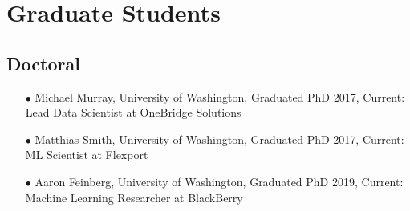 \documentclass{article}[10pt]
\begin{document}
\section*{Graduate Students} %
\subsection*{Doctoral}
\begin{itemize}
\item [$\bullet$] Michael Murray, University of Washington, Graduated PhD 2017, Current: Lead Data Scientist at OneBridge Solutions
\item [$\bullet$] Matthias Smith, University of Washington, Graduated PhD 2017, Current: ML Scientist at Flexport 
\item [$\bullet$] Aaron Feinberg, University of Washington, Graduated PhD 2019, Current: Machine Learning Researcher at BlackBerry
\end{itemize}
\end{document}
